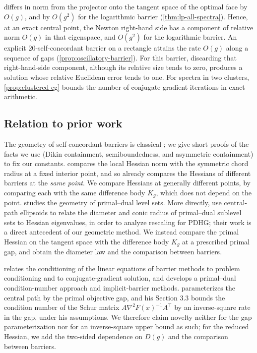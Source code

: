 \begin{enumerate}
differs in norm from the projector onto the tangent space of the optimal
face by $O(g)$, and by $O(g^2)$ for the logarithmic barrier
(\cref{thm:lp-all-spectra}). Hence, at an exact central point, the
Newton right-hand side has a component of relative norm $O(g)$ in that
eigenspace, and $O(g^2)$ for the logarithmic barrier. An explicit $20$-self-concordant barrier
on a rectangle attains the rate $O(g)$ along a sequence of gaps
(\cref{prop:oscillatory-barrier}). For this barrier, discarding that
right-hand-side component, although its relative size tends to zero,
produces a solution whose relative Euclidean error tends to one.
For spectra in two clusters, \cref{prop:clustered-cg} bounds the
number of conjugate-gradient iterations in exact arithmetic.
\end{enumerate}

\subsection{Relation to prior work}

The geometry of self-concordant barriers is classical
\citep{nesterov1994,renegar2001,nesterov2018}; we give short proofs of
the facts we use (Dikin containment, semiboundedness, and asymmetric
containment) to fix our constants.
\citet[Proposition 2.3.2(iii), equation (2.3.9)]{nesterov1994} compares
the local Hessian norm with the symmetric chord radius at a fixed
interior point, and so already compares the Hessians of different
barriers at the \emph{same point}. We compare Hessians at generally
different points, by comparing each with the same difference body $K_g$,
which does not depend on the point.
\citet{freund2003} studies the geometry of primal--dual level sets.
More directly, \citet[Section 5.1, Fact 5.2 and Remark
5.1]{xiongfreund2024} use central-path ellipsoids to relate the diameter
and conic radius of primal--dual sublevel sets to Hessian eigenvalues,
in order to analyze rescaling for PDHG; their work is a direct
antecedent of our geometric method. We instead compare the primal
Hessian on the tangent space with the difference body $K_g$ at a
prescribed primal gap, and obtain the diameter law and the comparison
between barriers.

\citet{renegar1996} relates the conditioning of the linear equations of
barrier methods to problem conditioning and to conjugate-gradient
solution, and \citet{pena2001,pena2002} develops a primal--dual
condition-number approach and implicit-barrier methods.
\citet[Proposition 3.2]{pena2002} parameterizes the central
path by the primal objective gap, and his Section 3.3 bounds the
condition number of the Schur matrix $A\nabla^2F(x)^{-1}A^\top$ by an
inverse-square rate in the gap, under his assumptions. We therefore
claim novelty neither for the gap parameterization nor for an
inverse-square upper bound as such; for the reduced Hessian, we
add the two-sided dependence on $D(g)$ and the comparison
between barriers.

